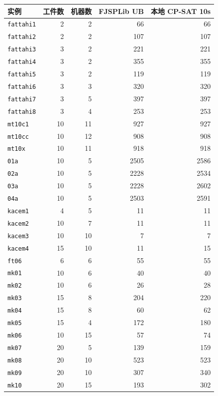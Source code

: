 ﻿\documentclass[11pt]{ctexart}
\begin{document}
\begin{table}[h]
\centering
\begin{tabular}{lrrrr}
\toprule
实例 & 工件数 & 机器数 & FJSPLib UB & 本地 CP-SAT 10s \\
\midrule
\texttt{fattahi1} & 2 & 2 & 66 & 66 \\
\texttt{fattahi2} & 2 & 2 & 107 & 107 \\
\texttt{fattahi3} & 3 & 2 & 221 & 221 \\
\texttt{fattahi4} & 3 & 2 & 355 & 355 \\
\texttt{fattahi5} & 3 & 2 & 119 & 119 \\
\texttt{fattahi6} & 3 & 3 & 320 & 320 \\
\texttt{fattahi7} & 3 & 5 & 397 & 397 \\
\texttt{fattahi8} & 3 & 4 & 253 & 253 \\
\texttt{mt10c1} & 10 & 11 & 927 & 927 \\
\texttt{mt10cc} & 10 & 12 & 908 & 908 \\
\texttt{mt10x} & 10 & 11 & 918 & 918 \\
\texttt{01a} & 10 & 5 & 2505 & 2586 \\
\texttt{02a} & 10 & 5 & 2228 & 2534 \\
\texttt{03a} & 10 & 5 & 2228 & 2602 \\
\texttt{04a} & 10 & 5 & 2503 & 2591 \\
\texttt{kacem1} & 4 & 5 & 11 & 11 \\
\texttt{kacem2} & 10 & 7 & 11 & 11 \\
\texttt{kacem3} & 10 & 10 & 7 & 7 \\
\texttt{kacem4} & 15 & 10 & 11 & 15 \\
\texttt{ft06} & 6 & 6 & 55 & 55 \\
\texttt{mk01} & 10 & 6 & 40 & 40 \\
\texttt{mk02} & 10 & 6 & 26 & 28 \\
\texttt{mk03} & 15 & 8 & 204 & 220 \\
\texttt{mk04} & 15 & 8 & 60 & 62 \\
\texttt{mk05} & 15 & 4 & 172 & 180 \\
\texttt{mk06} & 10 & 15 & 57 & 74 \\
\texttt{mk07} & 20 & 5 & 139 & 159 \\
\texttt{mk08} & 20 & 10 & 523 & 523 \\
\texttt{mk09} & 20 & 10 & 307 & 340 \\
\texttt{mk10} & 20 & 15 & 193 & 302 \\
\bottomrule
\end{tabular}
\end{table}
\end{document}
